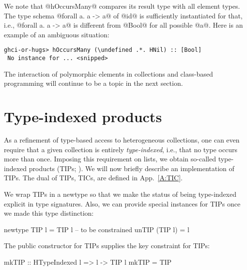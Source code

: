 \documentclass[nocopyrightspace,preprint]{sigplan-proc}
\newcommand{\hwVsTr}[2]{#2}
\newcommand{\undefined}{\ensuremath{\bot}}
\begin{document}
We note that @hOccursMany@ compares its result type with all element
types. The type schema @forall a. a -> a@ of @id@ is sufficiently
instantiated for that, i.e., @forall a. a -> a@ is different from
@Bool@ for all possible @a@. Here is an example of an ambiguous
situation:

\begin{Verbatim}[commandchars=\\\{\}]
 ghci-or-hugs> hOccursMany (\undefined .*. HNil) :: [Bool]
 No instance for ... <snipped>
\end{Verbatim}

The interaction of polymorphic elements in collections and class-based
programming will continue to be a topic in the next section.






\section{Type-indexed products}
\label{S:TIP}

As a refinement of type-based access to heterogeneous collections, one
can even require that a given collection is entirely
\emph{type-indexed}, i.e., that no type occurs more than
once. Imposing this requirement on lists, we obtain so-called
type-indexed products (TIPs; \cite{SM01}). We will now briefly
describe an implementation of TIPs\hwVsTr{; see~\cite{HList} for
details including the provision of TICs~---~the dual of TIPs.}{. The
dual of TIPs, TICs, are defined in App.~\ref{A:TIC}.}

We wrap TIPs in a newtype so that we make the status of being
type-indexed explicit in type signatures. Also, we can provide special
instances for TIPs once we made this type distinction:

\begin{code}
 newtype TIP l  = TIP l -- to be constrained
 unTIP  (TIP l) = l
\end{code}

The public constructor for TIPs supplies the key constraint for TIPs:

\begin{code}
 mkTIP :: HTypeIndexed l => l -> TIP l
 mkTIP = TIP
\end{code}
\end{document}

